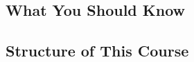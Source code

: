 \subsection{What You Should Know}

\begin{frame}{\myframetitle{}}
	\begin{fancycolumns}
	\nextcolumn
%
	\end{fancycolumns}
\end{frame}

\subsection{Structure of This Course}

